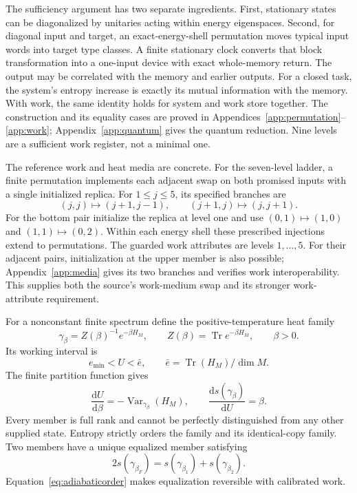 \documentclass[11pt,a4paper]{article}
\DeclareMathOperator{\Tr}{Tr}
\DeclareMathOperator{\Var}{Var}
\newcommand{\dd}{\mathrm{d}}
\begin{document}
The sufficiency argument has two separate ingredients. First, stationary states can be diagonalized by unitaries acting within energy eigenspaces. Second, for diagonal input and target, an exact-energy-shell permutation moves typical input words into target type classes. A finite stationary clock converts that block transformation into a one-input device with exact whole-memory return. The output may be correlated with the memory and earlier outputs. For a closed task, the system's entropy increase is exactly its mutual information with the memory. With work, the same identity holds for system and work store together. The construction and its equality cases are proved in Appendices~\ref{app:permutation}--\ref{app:work}; Appendix~\ref{app:quantum} gives the quantum reduction. Nine levels are a sufficient work register, not a minimal one.

The reference work and heat media are concrete. For the seven-level ladder, a finite permutation implements each adjacent swap on both promised inputs with a single initialized replica. For $1\le j\le5$, its specified branches are
\begin{equation}
 (j,j)\mapsto(j+1,j-1),\qquad (j+1,j)\mapsto(j,j+1). \label{eq:swap}
\end{equation}
For the bottom pair initialize the replica at level one and use $(0,1)\mapsto(1,0)$ and $(1,1)\mapsto(0,2)$. Within each energy shell these prescribed injections extend to permutations. The guarded work attributes are levels $1,\ldots,5$. For their adjacent pairs, initialization at the upper member is also possible; Appendix~\ref{app:media} gives its two branches and verifies work interoperability. This supplies both the source's work-medium swap and its stronger work-attribute requirement.

For a nonconstant finite spectrum define the positive-temperature heat family
\begin{equation}
 \gamma_\beta=Z(\beta)^{-1}e^{-\beta H_M},\qquad
 Z(\beta)=\Tr e^{-\beta H_M},\qquad\beta>0. \label{eq:gibbs}
\end{equation}
Its working interval is
\begin{equation}
 e_{\min}<U<\bar e,\qquad \bar e=\Tr(H_M)/\dim M. \label{eq:interval}
\end{equation}
The finite partition function gives
\begin{equation}
 \frac{\dd U}{\dd\beta}=-\Var_{\gamma_\beta}(H_M),\qquad
 \frac{\dd s(\gamma_\beta)}{\dd U}=\beta. \label{eq:gibbsderivatives}
\end{equation}
Every member is full rank and cannot be perfectly distinguished from any other supplied state. Entropy strictly orders the family and its identical-copy family. Two members have a unique equalized member satisfying
\begin{equation}
 2s(\gamma_{\beta_F})=s(\gamma_{\beta_1})+s(\gamma_{\beta_2}). \label{eq:equalize}
\end{equation}
Equation~\eqref{eq:adiabaticorder} makes equalization reversible with calibrated work.
\end{document}
